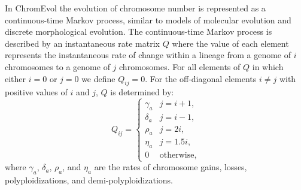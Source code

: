 In ChromEvol the evolution of chromosome number
is represented as a continuous-time Markov process,
similar to models of molecular evolution and discrete morphological evolution.
The continuous-time Markov process is described by
an instantaneous rate matrix $Q$ where the value of each element
represents the instantaneous rate of change within a lineage
from a genome of $i$ chromosomes to a genome of $j$ chromosomes.
For all elements of $Q$ in which either $i = 0$ or $j = 0$
we define $Q_{ij} = 0$.
For the off-diagonal elements $i \neq j$ with positive values of $i$ and $j$,
$Q$ is determined by:
\begin{equation} \label{eq:anagenetic1}
Q_{ij} = 
    \begin{cases}
        \gamma_a                          & j = i + 1,    \\
        \delta_a                          & j = i - 1,    \\
        \rho_a                                & j = 2i,       \\
        \eta_a                                 & j = 1.5i,     \\
        0                                   & \mbox{otherwise},   
    \end{cases}
\end{equation}
where $\gamma_a$, $\delta_a$, $\rho_a$, and $\eta_a$ are the
rates of chromosome gains, losses, polyploidizations, and
demi-polyploidizations.


